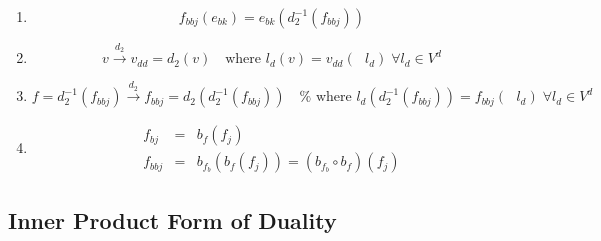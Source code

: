 \documentclass[aps,preprint]{revtex4}
\begin{document}
\begin{enumerate}
\item 
\begin{equation}
f_{bbj}\left( e_{bk}\right) =e_{bk}\left( d_{2}^{-1}\left( f_{bbj}\right)
\right)
\end{equation}

\item 
\begin{equation}
v\overset{d_{2}}{\rightarrow }v_{dd}=d_{2}\left( v\right) \quad \text{where }%
l_{d}\left( v\right) =v_{dd}\left( \text{ }l_{d}\right) \;\forall l_{d}\in
V^{d}
\end{equation}

\item 
\begin{equation}
f=d_{2}^{-1}\left( f_{bbj}\right) \overset{d_{2}}{\rightarrow }%
f_{bbj}=d_{2}\left( d_{2}^{-1}\left( f_{bbj}\right) \right) \quad \text{%
where }l_{d}\left( d_{2}^{-1}\left( f_{bbj}\right) \right) =f_{bbj}\left( 
\text{ }l_{d}\right) \;\forall l_{d}\in V^{d}
\end{equation}

\item 
\begin{eqnarray}
f_{bj} &=&b_{f}\left( f_{j}\right) \\
f_{bbj} &=&b_{f_{b}}\left( b_{f}\left( f_{j}\right) \right) =\left(
b_{f_{b}}\circ b_{f}\right) \left( f_{j}\right)
\end{eqnarray}
\end{enumerate}

\subsection{Inner Product Form of Duality \label{Inner Product Form of
Duality}}
\end{document}
